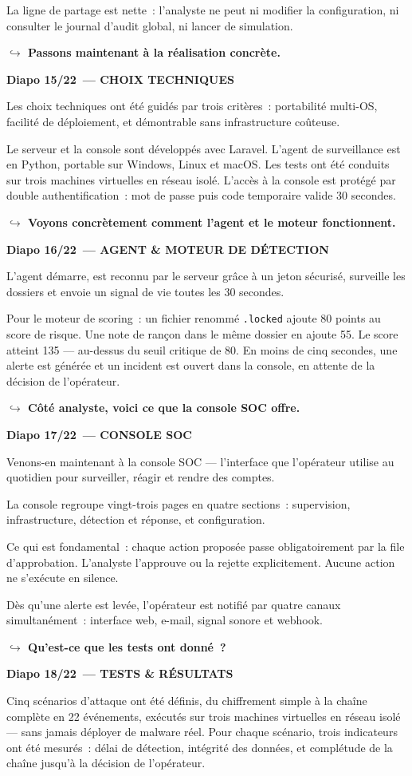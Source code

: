 \documentclass[a4paper,11pt]{article}
\newcommand{\notehead}[2]{%
  \par\vspace{14pt}%
  {\color{white}\colorbox{primary}{\parbox{\dimexpr\linewidth-12pt}{\vspace{3pt}%
    \bfseries\large Diapo #1~--- #2\vspace{3pt}}}}%
  \par\vspace{6pt}%
}
\newcommand{\pivot}[1]{%
  \par\vspace{3pt}%
  {\color{transition}\small\bfseries $\hookrightarrow$ #1}%
}
\begin{document}
La ligne de partage est nette~: l'analyste ne peut ni modifier la configuration, ni consulter
  le journal d'audit global, ni lancer de simulation.
\pivot{Passons maintenant à la réalisation concrète.}

\notehead{15/22}{CHOIX TECHNIQUES}
Les choix techniques ont été guidés par trois critères~: portabilité multi-OS, facilité de
  déploiement, et démontrable sans infrastructure coûteuse.

Le serveur et la console sont développés avec Laravel. L'agent de surveillance est en Python,
  portable sur Windows, Linux et macOS. Les tests ont été conduits sur trois machines virtuelles
  en réseau isolé. L'accès à la console est protégé par double authentification~: mot de passe
  puis code temporaire valide 30 secondes.
\pivot{Voyons concrètement comment l'agent et le moteur fonctionnent.}

\notehead{16/22}{AGENT \& MOTEUR DE DÉTECTION}
L'agent démarre, est reconnu par le serveur grâce à un jeton sécurisé, surveille les dossiers
  et envoie un signal de vie toutes les 30 secondes.

Pour le moteur de scoring~: un fichier renommé \texttt{.locked} ajoute 80 points au score de risque.
  Une note de rançon dans le même dossier en ajoute 55. Le score atteint 135 --- au-dessus du seuil
  critique de 80. En moins de cinq secondes, une alerte est générée et un incident est ouvert dans
  la console, en attente de la décision de l'opérateur.
\pivot{Côté analyste, voici ce que la console SOC offre.}

\notehead{17/22}{CONSOLE SOC}
Venons-en maintenant à la console SOC --- l'interface que l'opérateur utilise au quotidien pour
  surveiller, réagir et rendre des comptes.

La console regroupe vingt-trois pages en quatre sections~: supervision, infrastructure, détection
  et réponse, et configuration.

Ce qui est fondamental~: chaque action proposée passe obligatoirement par la file d'approbation.
  L'analyste l'approuve ou la rejette explicitement. Aucune action ne s'exécute en silence.

Dès qu'une alerte est levée, l'opérateur est notifié par quatre canaux simultanément~: interface
  web, e-mail, signal sonore et webhook.
\pivot{Qu'est-ce que les tests ont donné~?}

\notehead{18/22}{TESTS \& RÉSULTATS}
Cinq scénarios d'attaque ont été définis, du chiffrement simple à la chaîne complète en
  22 événements, exécutés sur trois machines virtuelles en réseau isolé --- sans jamais déployer
  de malware réel. Pour chaque scénario, trois indicateurs ont été mesurés~: délai de détection,
  intégrité des données, et complétude de la chaîne jusqu'à la décision de l'opérateur.
\end{document}
